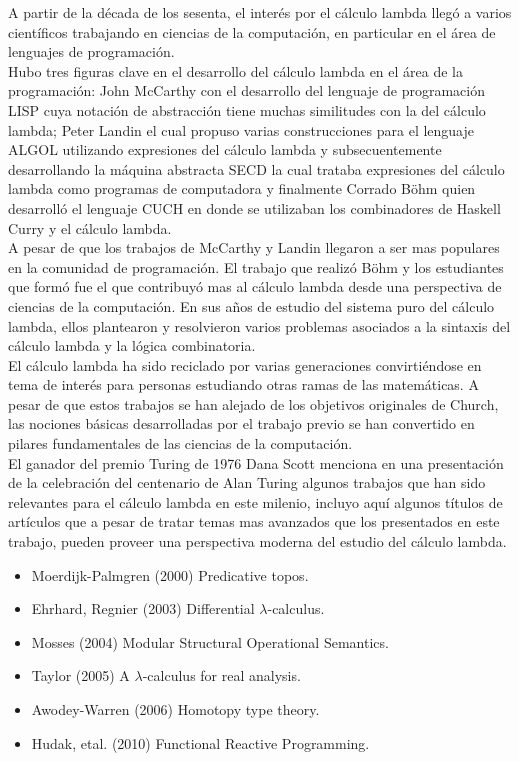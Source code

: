 A partir de la década de los sesenta, el interés por el cálculo lambda llegó a
varios científicos trabajando en ciencias de la computación, en
particular  en el área de lenguajes de programación.\\

Hubo tres figuras clave en el desarrollo del cálculo lambda en el área de la
programación: John McCarthy con el desarrollo del lenguaje de
programación LISP cuya notación de abstracción tiene muchas
similitudes con la del cálculo lambda; Peter Landin el cual propuso varias
construcciones para el lenguaje ALGOL utilizando expresiones del
cálculo lambda y subsecuentemente desarrollando la máquina abstracta SECD la cual
trataba expresiones del cálculo lambda como programas de computadora y
finalmente Corrado Böhm quien desarrolló el lenguaje CUCH en donde se
utilizaban los combinadores de Haskell Curry y el cálculo lambda.\\

A pesar de que los trabajos de McCarthy y Landin llegaron a ser mas
populares en la comunidad de programación. El trabajo que realizó Böhm
y los estudiantes que formó fue el que contribuyó mas al cálculo lambda desde
una perspectiva de ciencias de la computación. En sus años de estudio
del sistema puro del cálculo lambda, ellos plantearon y resolvieron varios
problemas asociados a la sintaxis del cálculo lambda y la lógica combinatoria.\\

El cálculo lambda ha sido reciclado por varias generaciones convirtiéndose en
tema de interés para personas estudiando otras ramas de las
matemáticas. A pesar de que estos trabajos se han alejado de los
objetivos originales de Church, las  nociones básicas desarrolladas
por el trabajo previo se han convertido en pilares fundamentales de
las ciencias de la computación.\\

El ganador del premio Turing de 1976 Dana Scott menciona en una
presentación de la celebración del centenario de Alan Turing
\cite{Scott:TuringCentenary} algunos
trabajos que han sido relevantes para el cálculo lambda en este milenio,
incluyo aquí algunos títulos de artículos que a pesar de tratar temas
mas avanzados que los presentados en este trabajo, pueden proveer una
perspectiva moderna del estudio del cálculo lambda.\\

\begin{itemize}
\item Moerdijk-Palmgren (2000) Predicative topos.
\item Ehrhard, Regnier (2003) Differential \(\lambda\)-calculus.
\item Mosses (2004) Modular Structural Operational Semantics.
\item Taylor (2005) A \(\lambda\)-calculus for real analysis.
\item Awodey-Warren (2006) Homotopy type theory.
\item Hudak, etal. (2010) Functional Reactive Programming.
\end{itemize}



